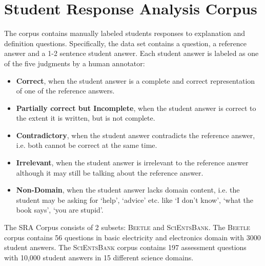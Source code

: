 \documentclass[a4paper]{article}
\begin{document}
\section{Student Response Analysis Corpus}
The corpus contains manually labeled students responses to explanation and definition questions\cite{dk}. Specifically, the data set contains a question, a reference answer and a 1-2 sentence student answer. Each student answer is labeled as one of the five judgments by a human annotator:
\begin{itemize}
	\item \textbf{Correct}, when the student answer is a complete and correct representation of one of the reference answers.
	\item \textbf{Partially correct but Incomplete}, when the student answer is correct to the extent it is written, but is not complete.
	\item \textbf{Contradictory}, when the student answer contradicts the reference answer, i.e. both cannot be correct at the same time.
	\item \textbf{Irrelevant}, when the student answer is irrelevant to the reference answer although it may still be talking about the reference answer. 
	\item \textbf{Non-Domain}, when the student answer lacks domain content, i.e. the student may be asking for `help', `advice' etc. like `I don't know', `what the book says', `you are stupid'.\\
\end{itemize}
The SRA Corpus consists of 2 subsets: \textsc{Beetle} and \textsc{SciEntsBank}. The \textsc{Beetle} corpus contains 56 questions in basic electricity and electronics domain with 3000 student answers. The \textsc{SciEntsBank} corpus\cite{nlsn} contains 197 assessment questions with 10,000 student answers in 15 different science domains.
\end{document}
